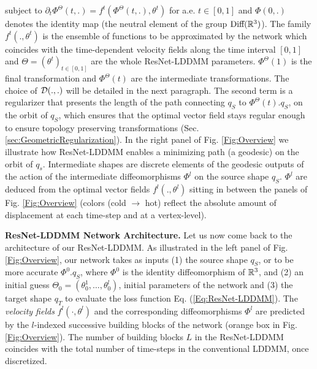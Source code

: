\noindent subject to $\partial_t \Phi^{\Theta}(t,.)=f^t(\Phi^{\Theta}(t,.),\theta^{t})$ for a.e. $t \in [0, 1]$ and $\Phi(0,.)$ denotes the identity map (the neutral element of the group $\textrm{Diff}(\mathbb{R}^3)$). The family $f^t(.,\theta^t)$ is the ensemble of functions to be approximated by the network which coincides with the time-dependent velocity fields along the time interval $[0,1]$ and $\Theta=(\theta^t)_{t \in [0,1]}$ are the whole ResNet-LDDMM parameters. $\Phi^{\Theta}(1)$ is the final transformation and $\Phi^{\Theta}(t)$ are the intermediate transformations. The choice of ${\cal D}(.,.)$ will be detailed in the next paragraph. The second term is a regularizer that presents the length of the path connecting $q_S$ to $\Phi^{\Theta}(t).q_S$, on the orbit of $q_S$, which ensures that the optimal vector field stays regular enough to ensure topology preserving transformations (Sec. \ref{sec:GeometricRegularization}). In the right panel of Fig. \ref{Fig:Overview} we illustrate how ResNet-LDDMM enables a minimizing path (a geodesic) on the orbit of $q_s$. Intermediate shapes are discrete elements of the geodesic outputs of the action of the intermediate diffeomorphisms $\Phi^l$ on the source shape $q_S$. $\Phi^l$ are deduced from the optimal vector fields $f^l(.,\theta^l)$ sitting in between the panels of Fig. \ref{Fig:Overview} (colors (cold $\to$ hot) reflect the absolute amount of displacement at each time-step and at a vertex-level).


\textbf{ResNet-LDDMM Network Architecture.} Let us now come back to the architecture of our ResNet-LDDMM. As illustrated in the left panel of Fig. \ref{Fig:Overview}, our network takes as inputs (1) the source shape $q_S$, or to be more accurate $\Phi^{0}.q_S$, where $\Phi^{0}$ is the identity diffeomorphism of $\mathbb{R}^3$, and (2) an initial guess $\Theta_0=(\theta_0^1,\dots,\theta_0^l)$, initial parameters of the network and (3) the target shape $q_T$ to evaluate the loss function Eq. (\ref{Eq:ResNet-LDDMM}). The \textit{velocity fields} $f^{l}(\cdot,\theta^l)$ and the corresponding diffeomorphisms $\Phi^{l}$ are predicted by the $l$-indexed successive building blocks of the network (orange box in Fig. \ref{Fig:Overview}). The number of building blocks $L$ in the ResNet-LDDMM coincides with the total number of time-steps in the conventional LDDMM, once discretized. 

